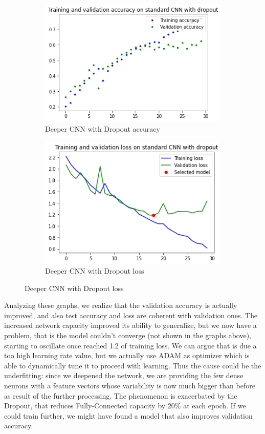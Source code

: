 \begin{figure}[H]
	\begin{subfigure}{0.5\textwidth}
		\includegraphics[width=0.9\linewidth]{img/scratch/deeper_dropout_acc.png} 
		\caption{Deeper CNN with Dropout accuracy}
		\label{fig:DeeperDroupoutacc}
	\end{subfigure}
	\begin{subfigure}{0.5\textwidth}
		\includegraphics[width=0.9\linewidth]{img/scratch/deeper_dropout_loss.png}
		\caption{Deeper CNN with Dropout loss}
		\label{fig:DeeperDropoutloss}
	\end{subfigure}
\end{figure}

\medskip

\noindent Analyzing these graphs, we realize that the validation accuracy is actually improved, and also test accuracy and loss are coherent with validation ones. The increased network capacity improved its ability to generalize, but we now have a problem, that is the model couldn't converge (not shown in the graphs above), starting to oscillate once reached 1.2 of training loss. We can argue that is due a too high learning rate value, but we actually use ADAM as optimizer which is able to dynamically tune it to proceed with learning. Thus the cause could be the underfitting: since we deepened the network, we are providing the few dense neurons with a feature vectors whose variability is now much bigger than before as result of the further processing. The phenomenon is exacerbated by the Dropout, that reduces Fully-Connected capacity by 20\% at each epoch. If we could train further, we might have found a model that also improves validation accuracy.




